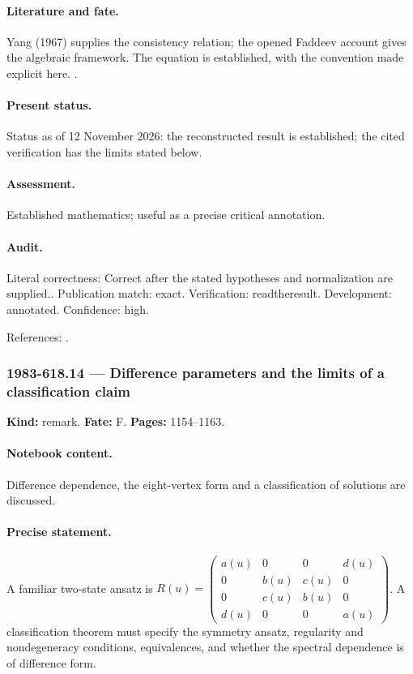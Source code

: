 \paragraph{Literature and fate.} Yang (1967) supplies the consistency relation; the opened Faddeev account gives the algebraic framework. The equation is established, with the convention made explicit here. \citep{yang1967manybody,sklyaninfaddeev1978quantum,faddeev1996bethe}.

\paragraph{Present status.} Status as of 12 November 2026: the reconstructed result is established; the cited verification has the limits stated below.

\paragraph{Assessment.} Established mathematics; useful as a precise critical annotation.

\paragraph{Audit.} Literal correctness: Correct after the stated hypotheses and normalization are supplied.. Publication match: exact. Verification: readtheresult. Development: annotated. Confidence: high.

\noindent References: \citep{yang1967manybody,sklyaninfaddeev1978quantum,faddeev1996bethe}.\par

\subsubsection{1983-618.14 --- Difference parameters and the limits of a classification claim}

\label{item:1983-618.14}

\noindent\textbf{Kind:} remark. \textbf{Fate:} F. \textbf{Pages:} 1154--1163.\par

\paragraph{Notebook content.} Difference dependence, the eight-vertex form and a classification of solutions are discussed.

\paragraph{Precise statement.} A familiar two-state ansatz is $R(u)=\begin{pmatrix}a(u)&0&0&d(u)\\0&b(u)&c(u)&0\\0&c(u)&b(u)&0\\d(u)&0&0&a(u)\end{pmatrix}$. A classification theorem must specify the symmetry ansatz, regularity and nondegeneracy conditions, equivalences, and whether the spectral dependence is of difference form.

